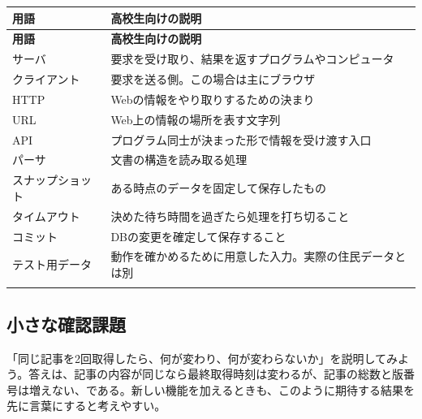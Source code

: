 \documentclass[a4paper,10pt]{ltjsarticle}
\begin{document}
{\small\begin{longtable}{@{}>{\raggedright\arraybackslash}p{}>{\raggedright\arraybackslash}p{}@{}}

\rowcolor{Pale}\textbf{用語} & \textbf{高校生向けの説明} \\ \midrule

\endfirsthead

\rowcolor{Pale}\textbf{用語} & \textbf{高校生向けの説明} \\ \midrule\endhead

サーバ & 要求を受け取り、結果を返すプログラムやコンピュータ \\ \addlinespace[3pt]

クライアント & 要求を送る側。この場合は主にブラウザ \\ \addlinespace[3pt]

HTTP & Webの情報をやり取りするための決まり \\ \addlinespace[3pt]

URL & Web上の情報の場所を表す文字列 \\ \addlinespace[3pt]

API & プログラム同士が決まった形で情報を受け渡す入口 \\ \addlinespace[3pt]

パーサ & 文書の構造を読み取る処理 \\ \addlinespace[3pt]

スナップショット & ある時点のデータを固定して保存したもの \\ \addlinespace[3pt]

タイムアウト & 決めた待ち時間を過ぎたら処理を打ち切ること \\ \addlinespace[3pt]

コミット & DBの変更を確定して保存すること \\ \addlinespace[3pt]

テスト用データ & 動作を確かめるために用意した入力。実際の住民データとは別 \\ \addlinespace[3pt]

\bottomrule\end{longtable}}

\subsection*{小さな確認課題}

「同じ記事を2回取得したら、何が変わり、何が変わらないか」を説明してみよう。答えは、記事の内容が同じなら最終取得時刻は変わるが、記事の総数と版番号は増えない、である。新しい機能を加えるときも、このように期待する結果を先に言葉にすると考えやすい。
\end{document}
